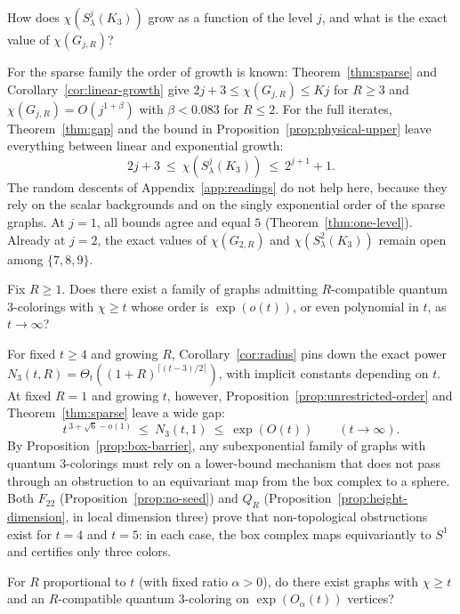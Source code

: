 \begin{problem}\label{prob:growth}
How does $\chi(S^j_\lambda(K_3))$ grow as a function of the level $j$, and what is the exact value of $\chi(G_{j,R})$?
\end{problem}

For the sparse family the order of growth is known: Theorem~\ref{thm:sparse} and Corollary~\ref{cor:linear-growth} give $2j+3\le\chi(G_{j,R})\le Kj$ for $R\ge3$ and $\chi(G_{j,R})=O(j^{1+\beta})$ with $\beta<0.083$ for $R\le2$. For the full iterates, Theorem~\ref{thm:gap} and the bound in Proposition~\ref{prop:physical-upper} leave everything between linear and exponential growth:
\[
 2j+3\ \le\ \chi(S^j_\lambda(K_3))\ \le\ 2^{j+1}+1.
\]
The random descents of Appendix~\ref{app:readings} do not help here, because they rely on the scalar backgrounds and on the singly exponential order of the sparse graphs. At $j=1$, all bounds agree and equal $5$ (Theorem~\ref{thm:one-level}). Already at $j=2$, the exact values of $\chi(G_{2,R})$ and $\chi(S^2_\lambda(K_3))$ remain open among $\{7,8,9\}$.

\begin{problem}\label{prob:fixed-radius}
Fix $R\ge1$. Does there exist a family of graphs admitting $R$-compatible quantum $3$-colorings with $\chi\ge t$ whose order is $\exp(o(t))$, or even polynomial in $t$, as $t\to\infty$?
\end{problem}

For fixed $t\ge4$ and growing $R$, Corollary~\ref{cor:radius} pins down the exact power $N_3(t,R)=\Theta_t((1+R)^{\lceil(t-3)/2\rceil})$, with implicit constants depending on $t$. At fixed $R=1$ and growing $t$, however, Proposition~\ref{prop:unrestricted-order} and Theorem~\ref{thm:sparse} leave a wide gap:
\[
 t^{\,3+\sqrt6-o(1)}\ \le\ N_3(t,1)\ \le\ \exp(O(t))\qquad (t\to\infty).
\]
By Proposition~\ref{prop:box-barrier}, any subexponential family of graphs with quantum $3$-colorings must rely on a lower-bound mechanism that does not pass through an obstruction to an equivariant map from the box complex to a sphere. Both $F_{22}$ (Proposition~\ref{prop:no-seed}) and $Q_R$ (Proposition~\ref{prop:height-dimension}, in local dimension three) prove that non-topological obstructions exist for $t=4$ and $t=5$: in each case, the box complex maps equivariantly to $S^1$ and certifies only three colors.

\begin{problem}\label{prob:radius-growing}
For $R$ proportional to $t$ (with fixed ratio $\alpha>0$), do there exist graphs with $\chi\ge t$ and an $R$-compatible quantum $3$-coloring on $\exp(O_\alpha(t))$ vertices?
\end{problem}

